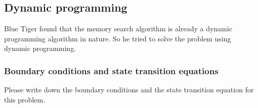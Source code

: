 \documentclass[11pt]{exam}
\begin{document}
\subsection{Dynamic programming}
Blue Tiger found that the memory search algorithm is already a dynamic programming algorithm in nature. 
So he tried to solve the problem using dynamic programming.
\subsubsection{Boundary conditions and state transition equations}
Please write down the boundary conditions and the state transition equation for this problem.
\begin{solution}
    \\ \hspace*{\fill} \\
    \\ \hspace*{\fill} \\
    \\ \hspace*{\fill} \\
    \\ \hspace*{\fill} \\
    \\ \hspace*{\fill} \\
    \\ \hspace*{\fill} \\
    \\ \hspace*{\fill} \\
    \\ \hspace*{\fill} \\
\end{solution}
\end{document}
